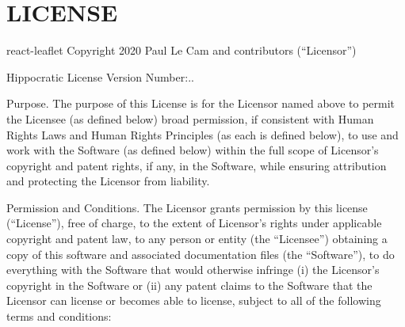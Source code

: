 \chapter{LICENSE }
\hypertarget{md_frontend_2node__modules_2react-leaflet_2LICENSE}{}\label{md_frontend_2node__modules_2react-leaflet_2LICENSE}
react-\/leaflet Copyright 2020 Paul Le Cam and contributors (“\+Licensor”)

Hippocratic License Version Number:..

Purpose. The purpose of this License is for the Licensor named above to permit the Licensee (as defined below) broad permission, if consistent with Human Rights Laws and Human Rights Principles (as each is defined below), to use and work with the Software (as defined below) within the full scope of Licensor’s copyright and patent rights, if any, in the Software, while ensuring attribution and protecting the Licensor from liability.

Permission and Conditions. The Licensor grants permission by this license (“\+License”), free of charge, to the extent of Licensor’s rights under applicable copyright and patent law, to any person or entity (the “\+Licensee”) obtaining a copy of this software and associated documentation files (the “\+Software”), to do everything with the Software that would otherwise infringe (i) the Licensor’s copyright in the Software or (ii) any patent claims to the Software that the Licensor can license or becomes able to license, subject to all of the following terms and conditions:\+


